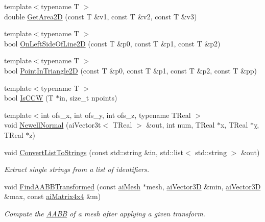 \begin{DoxyCompactItemize}
\item 
{\footnotesize template$<$typename T $>$ }\\double \hyperlink{namespace_assimp_af60598b5a7161a8c918b65fea426c08d}{Get\+Area2\+D} (const T \&v1, const T \&v2, const T \&v3)
\item 
{\footnotesize template$<$typename T $>$ }\\bool \hyperlink{namespace_assimp_a8befcf1030197c725d93b98d558bec85}{On\+Left\+Side\+Of\+Line2\+D} (const T \&p0, const T \&p1, const T \&p2)
\item 
{\footnotesize template$<$typename T $>$ }\\bool \hyperlink{namespace_assimp_adfc6439fa2efcc68e6e1591411dc3ab8}{Point\+In\+Triangle2\+D} (const T \&p0, const T \&p1, const T \&p2, const T \&pp)
\item 
{\footnotesize template$<$typename T $>$ }\\bool \hyperlink{namespace_assimp_a8d01c8219b0bc01a2ecf0012ed671889}{Is\+C\+C\+W} (T $\ast$in, size\+\_\+t npoints)
\item 
{\footnotesize template$<$int ofs\+\_\+x, int ofs\+\_\+y, int ofs\+\_\+z, typename T\+Real $>$ }\\void \hyperlink{namespace_assimp_af542a87f4818ee15b1ee8bd25c480d82}{Newell\+Normal} (ai\+Vector3t$<$ T\+Real $>$ \&out, int num, T\+Real $\ast$x, T\+Real $\ast$\hyperlink{_ice_utils_8h_aa7ffaed69623192258fb8679569ff9ba}{y}, T\+Real $\ast$z)
\item 
void \hyperlink{namespace_assimp_a1427aee7ea9b613a4677c68d40d68b3b}{Convert\+List\+To\+Strings} (const std\+::string \&in, std\+::list$<$ std\+::string $>$ \&out)
\begin{DoxyCompactList}\small\item\em Extract single strings from a list of identifiers. \end{DoxyCompactList}\item 
void \hyperlink{namespace_assimp_a40d018d9f497377fa37b58d7c7cb1e56}{Find\+A\+A\+B\+B\+Transformed} (const \hyperlink{structai_mesh}{ai\+Mesh} $\ast$mesh, \hyperlink{structai_vector3_d}{ai\+Vector3\+D} \&min, \hyperlink{structai_vector3_d}{ai\+Vector3\+D} \&max, const \hyperlink{structai_matrix4x4}{ai\+Matrix4x4} \&m)
\begin{DoxyCompactList}\small\item\em Compute the \hyperlink{class_a_a_b_b}{A\+A\+B\+B} of a mesh after applying a given transform. \end{DoxyCompactList}\item 

\end{DoxyCompactItemize}

